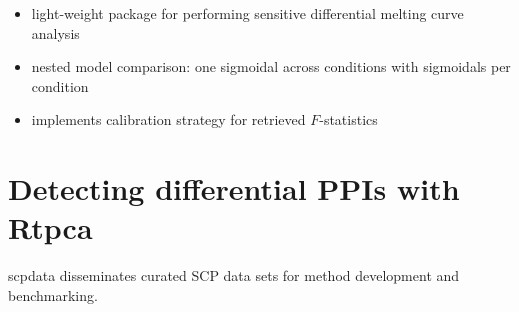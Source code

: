 \documentclass{article}
\newcommand{\hcode}[2][lgray]{{\ttfamily\color{vdgray}\colorbox{#1}{#2}}}
\begin{document}
\begin{multicols}{2}
\begin{minipage}[t]{\linewidth}
  \begin{itemize}

  \item light-weight package for performing sensitive differential melting curve analysis
  \item nested model comparison: one sigmoidal across conditions with sigmoidals per condition
  \item implements calibration strategy for retrieved $F$-statistics

  \end{itemize}
\end{minipage}


\noindent
\begin{minipage}[t]{\linewidth}
  \vspace{0.55cm}
  \section*{\huge Detecting differential PPIs with \hcode{Rtpca}}
  
  \hcode{scpdata} disseminates curated SCP data sets for method 
  development and benchmarking.
  \vspace{0.1cm}
  

\end{minipage}
\end{multicols}
\end{document}
